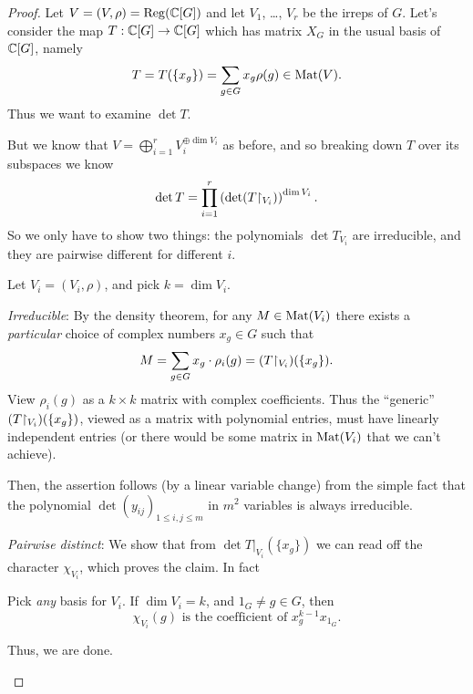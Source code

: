 \begin{proof}
	Let $V = (V, \rho) = \operatorname{Reg}(\mathbb C[G])$ and let $V_1$, \dots, $V_r$
	be the irreps of $G$.
	Let's consider the map $T : \mathbb C[G] \to \mathbb C[G]$
	which has matrix $X_G$ in the usual basis of $\mathbb C[G]$, namely
	\[ T = T(\{x_g\}) = \sum_{g \in G} x_g \rho(g) \in \mathrm{Mat}(V). \]
	Thus we want to examine $\det T$.

	But we know that $V = \bigoplus_{i=1}^r V_i^{\oplus \dim V_i}$
	as before, and so breaking down $T$ over its subspaces we know
	\[
		\det T
		= \prod_{i=1}^r \left( \det (T \restrict{V_i})  \right)^{\dim V_i}.
	\]
	So we only have to show two things:
	the polynomials $\det T_{V_i}$ are irreducible,
	and they are pairwise different for different $i$.

	Let $V_i = (V_i, \rho)$, and pick $k = \dim V_i$.
	\begin{itemize}
		\ii \emph{Irreducible}:
		By the density theorem, for any $M \in \mathrm{Mat}(V_i)$ there exists
		a \emph{particular} choice of complex numbers $x_g \in G$ such that
		\[
			M = \sum_{g \in G} x_g
			\cdot \rho_i(g)
			= (T \restrict{V_i})(\{x_g\}).
		\]
		View $\rho_i(g)$ as a $k \times k$ matrix with complex coefficients.
		Thus the ``generic'' $(T \restrict{V_i})(\{x_g\})$, viewed as a matrix with
		polynomial entries, must have linearly independent entries
		(or there would be some matrix in $\mathrm{Mat}(V_i)$ that we can't achieve).

		Then, the assertion follows (by a linear variable change)
		from the simple fact that the polynomial
		$\det (y_{ij})_{1 \le i, j \le m}$ in $m^2$ variables
		is always irreducible.

		\ii \emph{Pairwise distinct}:
		We show that from $\det T|_{V_i}(\{x_g\})$ we can read
		off the character $\chi_{V_i}$, which proves the claim.
		In fact
		\begin{exercise}
			Pick \emph{any} basis for $V_i$.
			If $\dim V_i = k$, and $1_G \neq g \in G$, then
			\[
				\chi_{V_i} (g)
				\text{ is the coefficient of } x_g^{k-1} x_{1_G}.
			\]
		\end{exercise}
		Thus, we are done. \qedhere
	\end{itemize}
\end{proof}

